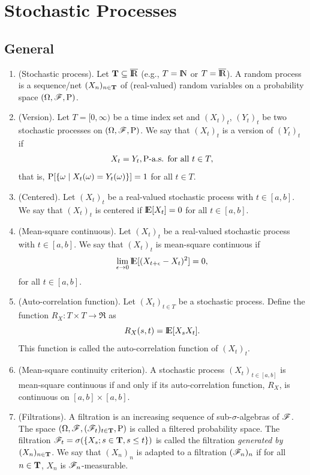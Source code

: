 \documentclass[a4paper,10pt]{scrbook}
\begin{document}
\chapter{Stochastic Processes}\label{sec:stoch-proc}
\section{General}\label{sec:stoch-proc-general}
\begin{enumerate}
 \item (Stochastic process). Let $\T \subseteq \barre$ (e.g., $T=\N$ or $T=\barre$). A random process is 
       a sequence/net $(X_n)_{n\in \mathbf{T}}$ of (real-valued) random variables on a probability space $(\Omega,\mathscr{F},\mathrm{P})$.

 \item (Version). Let \(T=[0,\infty)\) be a time index set and \((X_t)_t\), \((Y_t)_t\) be two stochastic processes 
                  on \((\Omega,\mathscr{F},\mathrm{P})\). We say that  \((X_t)_t\) is a version of \((Y_t)_t\)  if 
                  \[
                   X_t = Y_t, \mathrm{P}{\text{-a.s. for all }} t\in T,
                  \]
                  that is, \(\mathrm{P}[\{\omega \mid X_t(\omega) = Y_t(\omega)\}] = 1\) for all \(t\in T\).

                  
 \item (Centered). Let \((X_t)_t\) be a real-valued stochastic process with \(t\in[a,b]\).
       We say that \((X_t)_t\) is centered if \(\E[X_t]=0\) for all \(t\in[a,b]\).
       
 \item (Mean-square continuous). Let \((X_t)_t\) be a real-valued stochastic process with \(t\in[a,b]\).
       We say that \((X_t)_t\) is mean-square continuous if 
       \[
        \lim_{\epsilon \to 0}\E[(X_{t+\epsilon}-X_t)^2]=0,
       \]
       for all \(t\in[a,b]\).

 \item (Auto-correlation function). Let \((X_t)_{t\in T}\) be a stochastic process. Define 
       the function \(R_X:T\times T\to \Re\) as 
       \[
        R_X(s,t) = \E[X_s X_t].
       \]
       This function is called the auto-correlation function of \((X_t)_t\).
       
 \item (Mean-square continuity criterion). A stochastic process \((X_t)_{t\in[a,b]}\) is
       mean-square continuous if and only if its auto-correlation function, \(R_X\), is 
       continuous on \([a,b]\times [a,b]\).
       
 \item (Filtrations). A filtration is an increasing sequence of sub-$\sigma$-algebras of $\mathscr{F}$. The space 
       $(\Omega, \mathscr{F}, (\mathscr{F}_t)_{t\in \mathbf{T}}, \mathrm{P})$ is called a filtered probability space. The filtration 
       $\mathscr{F}_t = \sigma(\{X_s; s\in \mathbf{T}, s\leq t\})$ is called the filtration \textit{generated by $(X_n)_{n\in \mathbf{T}}$}.
       We say that $(X_n)_n$ is adapted to a filtration $(\mathscr{F}_n)_n$ if for all $n\in \mathbf{T}$, $X_n$ is $\mathscr{F}_n$-measurable.
       

\end{enumerate}
\end{document}
